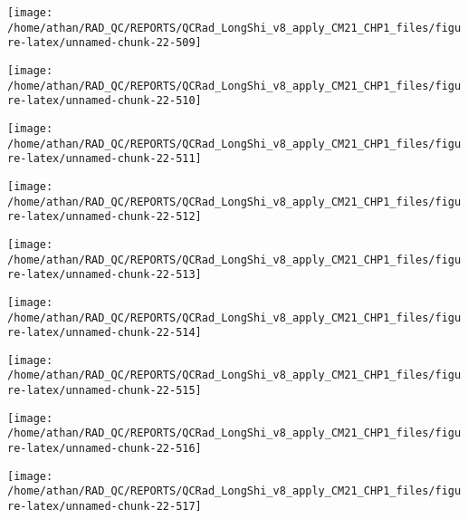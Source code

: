 \documentclass[
  10pt,
  a4paper,oneside]{article}
\begin{document}
\begin{center}\texttt{[image: /home/athan/RAD\_QC/REPORTS/QCRad\_LongShi\_v8\_apply\_CM21\_CHP1\_files/figure-latex/unnamed-chunk-22-509]} \end{center}

\begin{center}\texttt{[image: /home/athan/RAD\_QC/REPORTS/QCRad\_LongShi\_v8\_apply\_CM21\_CHP1\_files/figure-latex/unnamed-chunk-22-510]} \end{center}

\begin{center}\texttt{[image: /home/athan/RAD\_QC/REPORTS/QCRad\_LongShi\_v8\_apply\_CM21\_CHP1\_files/figure-latex/unnamed-chunk-22-511]} \end{center}

\begin{center}\texttt{[image: /home/athan/RAD\_QC/REPORTS/QCRad\_LongShi\_v8\_apply\_CM21\_CHP1\_files/figure-latex/unnamed-chunk-22-512]} \end{center}

\begin{center}\texttt{[image: /home/athan/RAD\_QC/REPORTS/QCRad\_LongShi\_v8\_apply\_CM21\_CHP1\_files/figure-latex/unnamed-chunk-22-513]} \end{center}

\begin{center}\texttt{[image: /home/athan/RAD\_QC/REPORTS/QCRad\_LongShi\_v8\_apply\_CM21\_CHP1\_files/figure-latex/unnamed-chunk-22-514]} \end{center}

\begin{center}\texttt{[image: /home/athan/RAD\_QC/REPORTS/QCRad\_LongShi\_v8\_apply\_CM21\_CHP1\_files/figure-latex/unnamed-chunk-22-515]} \end{center}

\begin{center}\texttt{[image: /home/athan/RAD\_QC/REPORTS/QCRad\_LongShi\_v8\_apply\_CM21\_CHP1\_files/figure-latex/unnamed-chunk-22-516]} \end{center}

\begin{center}\texttt{[image: /home/athan/RAD\_QC/REPORTS/QCRad\_LongShi\_v8\_apply\_CM21\_CHP1\_files/figure-latex/unnamed-chunk-22-517]} \end{center}
\end{document}
